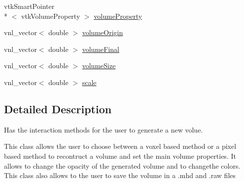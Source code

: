 \begin{DoxyCompactItemize}
\item 
vtk\-Smart\-Pointer\\*
$<$ vtk\-Volume\-Property $>$ \hyperlink{class_volume_reconstruction_widget_aa019933b9a5cdfee94739d13b383b7b8}{volume\-Property}
\item 
vnl\-\_\-vector$<$ double $>$ \hyperlink{class_volume_reconstruction_widget_a8a96c61c0e699daeaa349bc94610863b}{volume\-Origin}
\item 
vnl\-\_\-vector$<$ double $>$ \hyperlink{class_volume_reconstruction_widget_abb6e7b4895b0a9e6b60419b432b9afcb}{volume\-Final}
\item 
vnl\-\_\-vector$<$ double $>$ \hyperlink{class_volume_reconstruction_widget_ac6e459db730b1349685d3d01e95692bd}{volume\-Size}
\item 
vnl\-\_\-vector$<$ double $>$ \hyperlink{class_volume_reconstruction_widget_ae236e766bdd26a8e1d3af5abc965b558}{scale}
\end{DoxyCompactItemize}


\subsection{Detailed Description}
Has the interaction methods for the user to generate a new volue. 

This class allows the user to choose between a voxel based method or a pixel based method to recontruct a volume and set the main volume properties. It allows to change the opacity of the generated volume and to changethe colors. This class also allows to the user to save the volume in a .mhd and .raw files 

